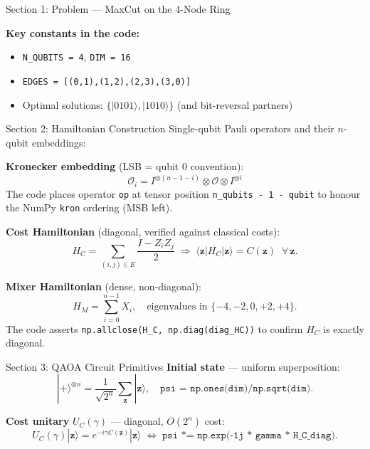 \documentclass{beamer}
\begin{document}
\begin{frame}
\begin{frame}[fragile]{Section 1: Problem — MaxCut on the 4-Node Ring}
\medskip

\textbf{Key constants in the code:}
\begin{itemize}
  \item \texttt{N\_QUBITS = 4}, \texttt{DIM = 16}
  \item \texttt{EDGES = [(0,1),(1,2),(2,3),(3,0)]}
  \item Optimal solutions: $\{|0101\rangle, |1010\rangle\}$ (and bit-reversal partners)
\end{itemize}
\end{frame}


\begin{frame}[fragile]{Section 2: Hamiltonian Construction}
Single-qubit Pauli operators and their $n$-qubit embeddings:

\medskip

\textbf{Kronecker embedding} (LSB = qubit 0 convention):
\[
  \mathcal{O}_i = I^{\otimes (n-1-i)} \otimes \mathcal{O} \otimes I^{\otimes i}
\]
The code places operator \texttt{op} at tensor position \texttt{n\_qubits - 1 - qubit}
to honour the NumPy \texttt{kron} ordering (MSB left).

\medskip

\textbf{Cost Hamiltonian} (diagonal, verified against classical costs):
\[
  H_C = \sum_{(i,j)\in E} \frac{I - Z_i Z_j}{2}
  \;\Longrightarrow\;
  \langle \mathbf{z} | H_C | \mathbf{z}\rangle = C(\mathbf{z}) \;\;\forall\,\mathbf{z}.
\]

\textbf{Mixer Hamiltonian} (dense, non-diagonal):
\[
  H_M = \sum_{i=0}^{n-1} X_i,
  \quad \text{eigenvalues in } \{-4,-2,0,+2,+4\}.
\]
The code asserts \texttt{np.allclose(H\_C, np.diag(diag\_HC))} to confirm
$H_C$ is exactly diagonal.
\end{frame}


\begin{frame}[fragile]{Section 3: QAOA Circuit Primitives}
\textbf{Initial state} — uniform superposition:
\[
  |{+}\rangle^{\otimes n} = \frac{1}{\sqrt{2^n}}\sum_{\mathbf{z}}|\mathbf{z}\rangle,
  \quad \texttt{psi = np.ones(dim)/np.sqrt(dim)}.
\]

\textbf{Cost unitary} $U_C(\gamma)$ — diagonal, $O(2^n)$ cost:
\[
  U_C(\gamma)|\mathbf{z}\rangle = e^{-i\gamma C(\mathbf{z})}|\mathbf{z}\rangle
  \;\Longleftrightarrow\;
  \texttt{psi *= np.exp(-1j * gamma * H\_C\_diag)}.
\]


\end{frame}
\end{frame}
\end{document}
